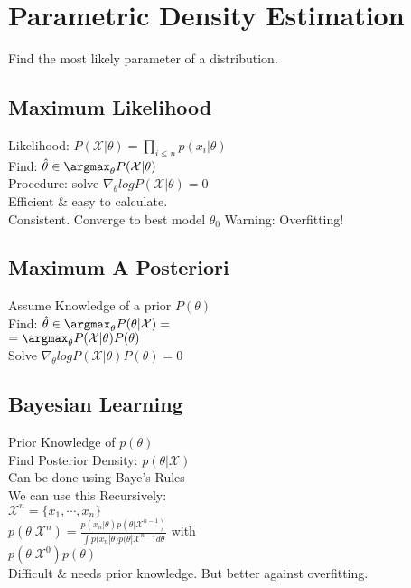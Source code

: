 \section*{Parametric Density Estimation}
Find the most likely parameter of a distribution.

\subsection*{Maximum Likelihood}
Likelihood: $P(\mathcal{X}|\theta)=\prod_{i\leq n}p(x_i|\theta)$\\
Find: $\hat{\theta}\in \argmax_\theta P(\mathcal{X}|\theta)$\\
Procedure: solve $\nabla_\theta log P(\mathcal{X}|\theta)=0$\\
Efficient \& easy to calculate.\\
Consistent. Converge to best model $\theta_0$
Warning: Overfitting!

\subsection*{Maximum A Posteriori}
Assume Knowledge of a prior $P(\theta)$\\
Find: $\hat{\theta}\in \argmax_\theta P(\theta|\mathcal{X}) =$\\
$=\argmax_\theta P(\mathcal{X}|\theta)P(\theta)$\\
Solve $\nabla_\theta log P(\mathcal{X}|\theta)P(\theta)=0$

\subsection{Bayesian Learning}
Prior Knowledge of $p(\theta)$\\
Find Posterior Density: $p(\theta|\mathcal{X})$\\
Can be done using Baye's Rules\\
We can use this Recursively:\\
$\mathcal{X}^n=\{x_1, \cdots, x_n\}$\\
$p(\theta|\mathcal{X}^n)=\frac{p(x_n|\theta)p(\theta|\mathcal{X}^{n-1})}{\int p(x_n|\theta)p(\theta|\mathcal{X}^{n-1} d\theta}$ with\\
$p(\theta|\mathcal{X}^0)p(\theta)$\\
Difficult \& needs prior knowledge. But better against overfitting.